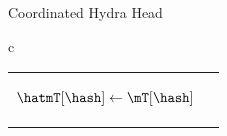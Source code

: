 \begin{figure*}[t!]
\begin{algobox}{Coordinated Hydra Head}
\begin{tabular}{c}
\begin{tabular}{c@{}c}
{\begin{walgo}{0.65}
{{              $\hatmT[\hash] \gets \mT[\hash]$ \; %
            }
            
          }

          \vspace{12pt} %

          \On{$(\hpRS,s,T)$ %
            from $\party_j$}{ %

            \Req $s = \has + 1$ %
            and $\hpLdr(s) = j$ \; %

            \Wait{$\bars = \hats$ %
              and $\barmU\applytx\Reach^{\mT}(T) \not= \bot$ %
            }{ %
               $\hats \gets \bars + 1$ \; %

               $\forall\tx\in\Reach^{\mT}(T)$:
                \Out $(\hpSeen,\tx)$ \; %
              
               $\hatmU \gets
               \Sno(\hats,\barmU\applytx\Reach^{\mT}(T))$ \; %

               $\msSig_i \gets %
               \msSign(\hyPr,\hatmU.h \| \hats)$ \; %
 
               \Send $(\hpAS,\hats,\msSig_i)$ %
               to $\party_j$ \; %

               \If{$\hpLdr(\hats+1) = i$}{
                 $\hatmT :\subseteq_{\mbox{max}} \mT$ s.t. $\hatmU\applytx\hatmT\not=\bot$ \; %
                 $\hatmL \gets \hatmU\applytx\hatmT$
               }
            }
           }
          
        \end{walgo}
        }
        &

        \adjustbox{valign=t,scale=\sfact}{
        \begin{walgo}{0.6}
          \On{$(\hpAS,s,\msSig_j)$ %
            from $\party_j$}{ %

            \Req $s = \hats$ \; %

            \Req $\hatmU.\hpSigs[j] = \eps$ \; %

            $\hatmU.\hpSigs[j] \gets \msSig_j$ \; %

            \If{$\forall k: \hatmU.\hpSigs[k] \neq \eps$}{ %
              $\msCSig %
              \gets \msComb(\hatmU.\hash \| s, %
              \msVKL, \hatmU.\hpSigs)$ \; %
              
              \If{$\msVfy(\msCVK, \hatmU.\hash \| \hats,\msCSig)$}{ %
              $\bars \gets s$ \; %
              $\hatmU.\msCSig \gets \msCSig$ \; %
              $\barmU \gets \hatmU$ \; %
              $T \gets \Reach^{\mT}(\barmU.T)$ \; %
              $\barmT \gets \barmT \cup T$ \; %

}}}
\end{walgo}}
\end{tabular}
\end{tabular}
\end{algobox}
\end{figure*}
